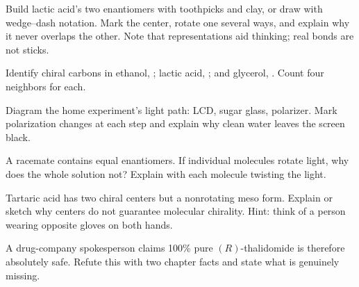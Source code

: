 \begin{sikaoti}
\item Build lactic acid's two enantiomers with toothpicks and clay, or draw with wedge--dash notation. Mark the center, rotate one several ways, and explain why it never overlaps the other. Note that representations aid thinking; real bonds are not sticks.
\item Identify chiral carbons in ethanol, ; lactic acid, ; and glycerol, . Count four neighbors for each.
\item Diagram the home experiment's light path: LCD, sugar glass, polarizer. Mark polarization changes at each step and explain why clean water leaves the screen black.
\item A racemate contains equal enantiomers. If individual molecules rotate light, why does the whole solution not? Explain with each molecule twisting the light.
\item Tartaric acid has two chiral centers but a nonrotating meso form. Explain or sketch why centers do not guarantee molecular chirality. Hint: think of a person wearing opposite gloves on both hands.
\item A drug-company spokesperson claims 100\% pure $(R)$-thalidomide is therefore absolutely safe. Refute this with two chapter facts and state what is genuinely missing.
\end{sikaoti}
